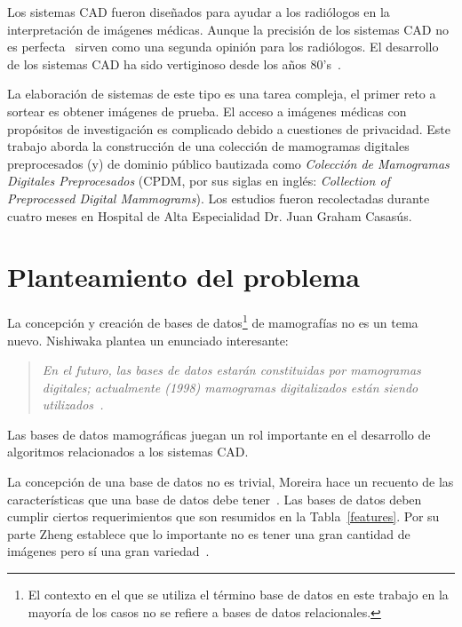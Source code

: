Los sistemas CAD fueron diseñados para ayudar a los radiólogos en la
interpretación de imágenes médicas. Aunque la precisión de los sistemas CAD no
es perfecta~\cite{fenton2007influence} sirven como una segunda opinión para los
radiólogos. El desarrollo de los sistemas CAD ha sido vertiginoso desde los
años 80's~\cite{giger2008anniversary}.

La elaboración de sistemas de este tipo es una tarea compleja, el primer reto a
sortear es obtener imágenes de prueba. El acceso a imágenes médicas con
propósitos de investigación es complicado debido a cuestiones de privacidad.
Este trabajo aborda la construcción de una colección de mamogramas digitales
preprocesados (y) de dominio público bautizada como \textit{Colección de
Mamogramas Digitales Preprocesados} (CPDM, por sus siglas en inglés:
\textit{Collection of Preprocessed Digital Mammograms}). Los estudios fueron
recolectadas durante cuatro meses en Hospital de Alta Especialidad Dr. Juan
Graham Casasús.

\section{Planteamiento del problema}

La concepción y creación de bases de datos\footnote{El contexto en el que se
utiliza el término base de datos en este trabajo en la mayoría de los casos no
se refiere a bases de datos relacionales.} de mamografías no es un tema nuevo.
Nishiwaka plantea un enunciado interesante: 

\begin{quotation}
\em En el futuro, las bases de datos estarán constituidas por mamogramas digitales;
actualmente (1998) mamogramas digitalizados están siendo
utilizados~\cite{nishikawa1998mammographic}.
\end{quotation}

Las bases de datos mamográficas juegan un rol importante en el desarrollo de
algoritmos relacionados a los sistemas CAD. 

La concepción de una base de datos no es trivial, Moreira hace un recuento de
las características que una base de datos debe
tener~\cite{moreira2012compliance}. Las bases de datos deben cumplir ciertos
requerimientos que son resumidos en la Tabla~\ref{features}. Por su parte Zheng
establece que lo importante no es tener una gran cantidad de imágenes pero sí
una gran variedad~\cite{zheng2010computer}.

